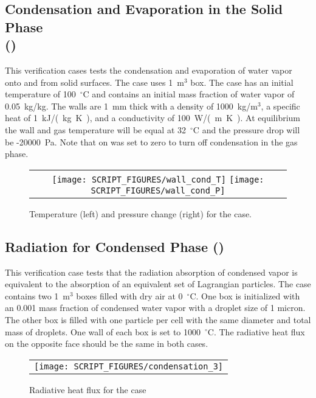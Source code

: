 \documentclass[11pt]{book}
\begin{document}
\subsection{Condensation and Evaporation in the Solid Phase\\(\texorpdfstring{}{wall\_cond})}
    \label{wall_condensation_evaporation}
This verification cases tests the condensation and evaporation of water vapor onto and from solid surfaces. The case uses 1~m$^3$ box. The case has an initial temperature of 100~$^\circ$C and contains an initial mass fraction of water vapor of 0.05~kg/kg. The walls are 1~mm thick with a density of 1000~kg/m$^3$, a specific heat of 1~\si{kJ/(kg.K)}, and a conductivity of 100~\si{W/(m.K)}. At equilibrium the wall and gas temperature will be equal at 32~$^\circ$C and the pressure drop will be -20000~Pa. Note that  on  was set to zero to turn off condensation in the gas phase.

\begin{figure}[ht]
    \centering
    \begin{tabular}{c}
        \texttt{[image: SCRIPT\_FIGURES/wall\_cond\_T]}
        \texttt{[image: SCRIPT\_FIGURES/wall\_cond\_P]}
    \end{tabular}
    \caption[Results of the   case]{Temperature (left) and pressure change (right) for the  case.}
    \label{fig:wall_condensation}
\end{figure}


\subsection{Radiation for Condensed Phase (\texorpdfstring{} {condensation\_3})}
\label{condensation_radiation}
This verification case tests that the radiation absorption of condensed vapor is equivalent to the absorption of an equivalent set of Lagrangian particles. The case contains two 1~m$^3$ boxes filled with dry air at 0~$^\circ$C. One box is initialized with an 0.001 mass fraction of condensed water vapor with a droplet size of 1 micron. The other box is filled with one particle per cell with the same diameter and total mass of droplets. One wall of each box is set to 1000~$^\circ$C. The radiative heat flux on the opposite face should be the same in both cases.

\begin{figure}[ht]
\centering
\begin{tabular}{c}
\texttt{[image: SCRIPT\_FIGURES/condensation\_3]}
\end{tabular}
\caption[Radiative heat flux for the  case]{Radiative heat flux for the  case}
\label{fig:condensation_3}
\end{figure}
\end{document}
